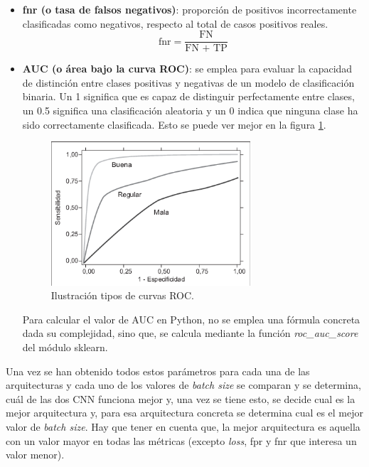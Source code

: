\begin{itemize}
\begin{equation*}
    \end{equation*}
    \item \textbf{fnr (o tasa de falsos negativos)}: proporción de positivos incorrectamente clasificadas como negativos, respecto al total de casos positivos reales.
    \begin{equation*}
        \text{fnr} = \frac{\text{FN}}{\text{FN + TP}}
    \end{equation*}
    \item \textbf{AUC (o área bajo la curva ROC)}: se emplea para evaluar la capacidad de distinción entre clases positivas y negativas de un modelo de clasificación binaria. Un 1 significa que es capaz de distinguir perfectamente entre clases, un 0.5 significa una clasificación aleatoria y un 0 indica que ninguna clase ha sido correctamente clasificada. Esto se puede ver mejor en la figura \ref{fig:roc}.
    \begin{figure}[h]
        \centering
        \includegraphics[width=0.70\textwidth]{img/roc.png}
        \caption{Ilustración tipos de curvas ROC. ~\cite{ResearchGate24}}
        \label{fig:roc}
    \end{figure}
    
    Para calcular el valor de AUC en Python, no se emplea una fórmula concreta dada su complejidad, sino que, se calcula mediante la función \textit{roc\_auc\_score} del módulo sklearn.
    
\end{itemize}

Una vez se han obtenido todos estos parámetros para cada una de las arquitecturas y cada uno de los valores de \textit{batch size} se comparan y se determina, cuál de las dos CNN funciona mejor y, una vez se tiene esto, se decide cual es la mejor arquitectura y, para esa arquitectura concreta se determina cual es el mejor valor de \textit{batch size}. Hay que tener en cuenta que, la mejor arquitectura es aquella con un valor mayor en todas las métricas (excepto \textit{loss}, fpr y fnr que interesa un valor menor).

